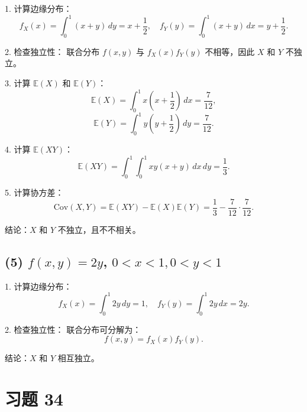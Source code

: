 \documentclass[twoside]{article}
\begin{document}
\begin{ans}{27}{27}
1. 计算边缘分布：
\[
f_X(x) = \int_{0}^{1} (x + y) \, dy = x + \frac{1}{2}, \quad f_Y(y) = \int_{0}^{1} (x + y) \, dx = y + \frac{1}{2}.
\]

2. 检查独立性：
联合分布 \( f(x, y) \) 与 \( f_X(x) f_Y(y) \) 不相等，因此 \( X \) 和 \( Y \) 不独立。

3. 计算 \( \mathbb{E}(X) \) 和 \( \mathbb{E}(Y) \)：
\[
\mathbb{E}(X) = \int_{0}^{1} x \left(x + \frac{1}{2}\right) \, dx = \frac{7}{12},
\]
\[
\mathbb{E}(Y) = \int_{0}^{1} y \left(y + \frac{1}{2}\right) \, dy = \frac{7}{12}.
\]

4. 计算 \( \mathbb{E}(XY) \)：
\[
\mathbb{E}(XY) = \int_{0}^{1} \int_{0}^{1} xy (x + y) \, dx \, dy = \frac{1}{3}.
\]

5. 计算协方差：
\[
\text{Cov}(X, Y) = \mathbb{E}(XY) - \mathbb{E}(X) \mathbb{E}(Y) = \frac{1}{3} - \frac{7}{12} \cdot \frac{7}{12}.
\]

结论：\( X \) 和 \( Y \) 不独立，且不不相关。

\subsection*{(5) \( f(x, y) = 2y \), \( 0 < x < 1, 0 < y < 1 \)}

1. 计算边缘分布：
\[
f_X(x) = \int_{0}^{1} 2y \, dy = 1, \quad f_Y(y) = \int_{0}^{1} 2y \, dx = 2y.
\]

2. 检查独立性：
联合分布可分解为：
\[
f(x, y) = f_X(x) f_Y(y).
\]

结论：\( X \) 和 \( Y \) 相互独立。

\end{ans}

\section{习题 34}
\end{document}
